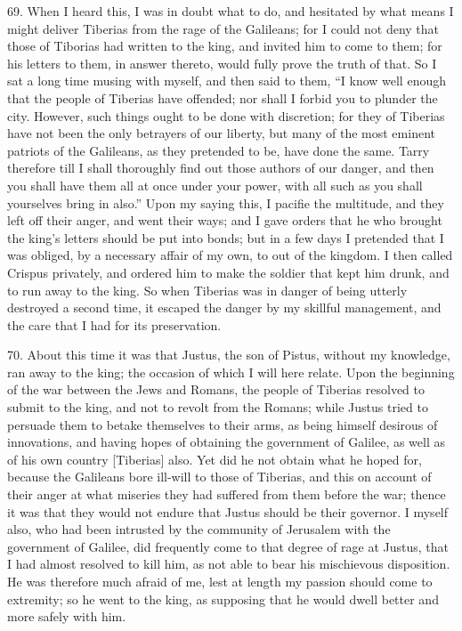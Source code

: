 69. When I heard this, I was in doubt what to do, and hesitated by what
means I might deliver Tiberias from the rage of the Galileans; for I could
not deny that those of Tiborias had written to the king, and invited him
to come to them; for his letters to them, in answer thereto, would fully
prove the truth of that. So I sat a long time musing with myself, and then
said to them, ``I know well enough that the people of Tiberias have
offended; nor shall I forbid you to plunder the city. However, such things
ought to be done with discretion; for they of Tiberias have not been the
only betrayers of our liberty, but many of the most eminent patriots of
the Galileans, as they pretended to be, have done the same. Tarry
therefore till I shall thoroughly find out those authors of our danger,
and then you shall have them all at once under your power, with all such
as you shall yourselves bring in also.'' Upon my saying this, I pacifie the
multitude, and they left off their anger, and went their ways; and I gave
orders that he who brought the king's letters should be put into bonds;
but in a few days I pretended that I was obliged, by a necessary affair of
my own, to out of the kingdom. I then called Crispus privately, and
ordered him to make the soldier that kept him drunk, and to run away to
the king. So when Tiberias was in danger of being utterly destroyed a
second time, it escaped the danger by my skillful management, and the care
that I had for its preservation.

70. About this time it was that Justus, the son of Pistus, without my
knowledge, ran away to the king; the occasion of which I will here relate.
Upon the beginning of the war between the Jews and Romans, the people of
Tiberias resolved to submit to the king, and not to revolt from the
Romans; while Justus tried to persuade them to betake themselves to their
arms, as being himself desirous of innovations, and having hopes of
obtaining the government of Galilee, as well as of his own country
[Tiberias] also. Yet did he not obtain what he hoped for, because the
Galileans bore ill-will to those of Tiberias, and this on account of their
anger at what miseries they had suffered from them before the war; thence
it was that they would not endure that Justus should be their governor. I
myself also, who had been intrusted by the community of Jerusalem with the
government of Galilee, did frequently come to that degree of rage at
Justus, that I had almost resolved to kill him, as not able to bear his
mischievous disposition. He was therefore much afraid of me, lest at
length my passion should come to extremity; so he went to the king, as
supposing that he would dwell better and more safely with him.

